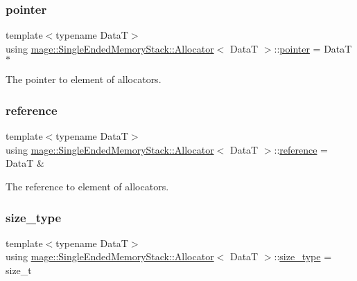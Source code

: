 \subsubsection{\texorpdfstring{pointer}{pointer}}
{\footnotesize\ttfamily template$<$typename DataT$>$ \\
using \hyperlink{structmage_1_1_single_ended_memory_stack_1_1_allocator}{mage\+::\+Single\+Ended\+Memory\+Stack\+::\+Allocator}$<$ DataT $>$\+::\hyperlink{structmage_1_1_single_ended_memory_stack_1_1_allocator_a2bc2a84329210a698f0e0bf76da88af3}{pointer} =  DataT $\ast$}

The pointer to element of allocators. \hypertarget{structmage_1_1_single_ended_memory_stack_1_1_allocator_a85ce7171363682bb03ec7b8ad5980b24}{}\label{structmage_1_1_single_ended_memory_stack_1_1_allocator_a85ce7171363682bb03ec7b8ad5980b24} 
\subsubsection{\texorpdfstring{reference}{reference}}
{\footnotesize\ttfamily template$<$typename DataT$>$ \\
using \hyperlink{structmage_1_1_single_ended_memory_stack_1_1_allocator}{mage\+::\+Single\+Ended\+Memory\+Stack\+::\+Allocator}$<$ DataT $>$\+::\hyperlink{structmage_1_1_single_ended_memory_stack_1_1_allocator_a85ce7171363682bb03ec7b8ad5980b24}{reference} =  DataT \&}

The reference to element of allocators. \hypertarget{structmage_1_1_single_ended_memory_stack_1_1_allocator_af04b72c8781cfb7148d8f0d4b0da41c3}{}\label{structmage_1_1_single_ended_memory_stack_1_1_allocator_af04b72c8781cfb7148d8f0d4b0da41c3} 
\subsubsection{\texorpdfstring{size\+\_\+type}{size\_type}}
{\footnotesize\ttfamily template$<$typename DataT$>$ \\
using \hyperlink{structmage_1_1_single_ended_memory_stack_1_1_allocator}{mage\+::\+Single\+Ended\+Memory\+Stack\+::\+Allocator}$<$ DataT $>$\+::\hyperlink{structmage_1_1_single_ended_memory_stack_1_1_allocator_af04b72c8781cfb7148d8f0d4b0da41c3}{size\+\_\+type} =  size\+\_\+t}

